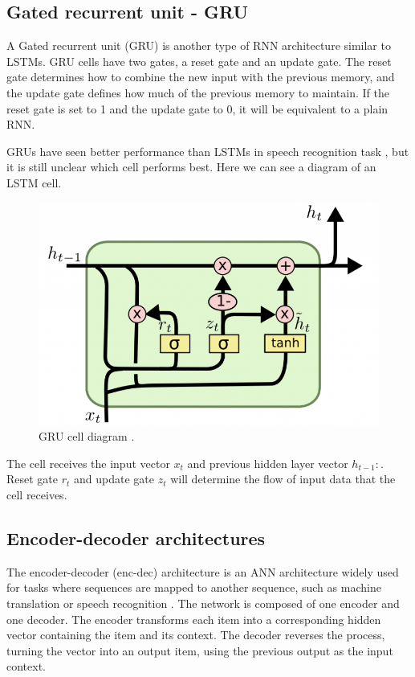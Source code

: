 \documentclass{kththesis}
\begin{document}
\subsection{Gated recurrent unit - GRU}
A Gated recurrent unit (GRU) \cite{gru} is another type of RNN architecture similar to LSTMs. GRU cells have two gates, a reset gate \cite{gru-forget} and an update gate. The reset gate determines how to combine the new input with the previous memory, and the update gate defines how much of the previous memory to maintain. If the reset gate is set to 1 and the update gate to 0, it will be equivalent to a plain RNN.

GRUs have seen better performance than LSTMs in speech recognition task \cite{gru-speech}, but it is still unclear which cell performs best. Here we can see a diagram of an LSTM cell. 

\begin{figure}[H]
    \centering
    \includegraphics[scale=0.6]{images/background/GRU-core.png}
    \caption{GRU cell diagram \cite{daniel}.}
    
\end{figure}

The cell receives the input vector $x_{t}$ and previous hidden layer vector $h_{t-1}:$. Reset gate $r_t$ and update gate $z_t$ will determine the flow of input data that the cell receives.

\subsection{Encoder-decoder architectures}
The encoder-decoder (enc-dec) architecture is an ANN architecture widely used for tasks where sequences are mapped to another sequence, such as machine translation or speech recognition \cite{encoder-decoder}. The network is composed of one encoder and one decoder. The encoder transforms each item into a corresponding hidden vector containing the item and its context. The decoder reverses the process, turning the vector into an output item, using the previous output as the input context.
\end{document}
